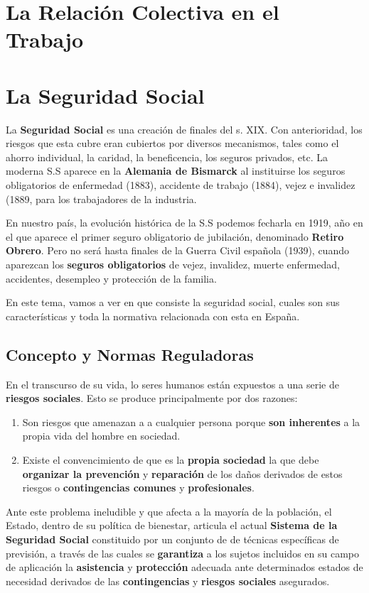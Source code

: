 \chapter{La Relación Colectiva en el Trabajo}

\chapter{La Seguridad Social}
La \textbf{Seguridad Social} es una creación de finales del s. XIX. Con anterioridad, los riesgos que esta cubre eran cubiertos por diversos mecanismos, tales como el ahorro individual, la caridad, la beneficencia, los seguros privados, etc. La moderna S.S aparece en la \textbf{Alemania de Bismarck} al instituirse los seguros obligatorios de enfermedad (1883), accidente de trabajo (1884), vejez e invalidez (1889, para los trabajadores de la industria.

En nuestro país, la evolución histórica de la S.S podemos fecharla en 1919, año en el que aparece el primer seguro obligatorio de jubilación, denominado \textbf{Retiro Obrero}. Pero no será hasta finales de la Guerra Civil española (1939), cuando aparezcan los \textbf{seguros obligatorios} de vejez, invalidez, muerte enfermedad, accidentes, desempleo y protección de la familia.

En este tema, vamos a ver en que consiste la seguridad social, cuales son sus características y toda la normativa relacionada con esta en España.

\section{Concepto y Normas Reguladoras}
En el transcurso de su vida, lo seres humanos están expuestos a una serie de \textbf{riesgos sociales}. Esto se produce principalmente por dos razones:

\begin{enumerate}
    \item Son riesgos que amenazan a a cualquier persona porque \textbf{son inherentes} a la propia vida del hombre en sociedad.
    \item Existe el convencimiento de que es la \textbf{propia sociedad} la que debe \textbf{organizar la prevención} y \textbf{reparación} de los daños derivados de estos riesgos o \textbf{contingencias comunes} y \textbf{profesionales}.
\end{enumerate}

Ante este problema ineludible y que afecta a la mayoría de la población, el Estado, dentro de su política de bienestar, articula el actual \textbf{Sistema de la Seguridad Social} constituido por un conjunto de de técnicas específicas de previsión, a través de las cuales se \textbf{garantiza} a los sujetos incluidos en su campo de aplicación la \textbf{asistencia} y \textbf{protección} adecuada ante determinados estados de necesidad derivados de las \textbf{contingencias} y \textbf{riesgos sociales} asegurados.

